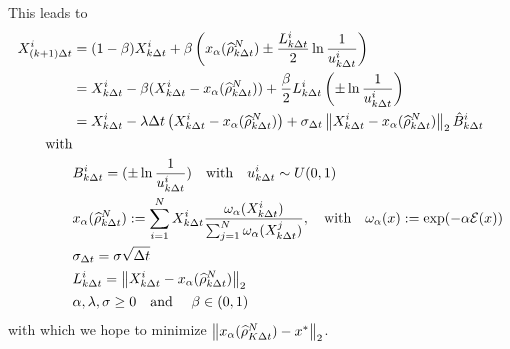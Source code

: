 \documentclass[a4paper, 11pt]{article}
\newcommand{\globmin}{x^*}
\newcommand{\omegaa}[0]{\omega_{\alpha}}
\newcommand{\conspoint}[1]{x_{\alpha}({#1})}
\newcommand{\empmeasure}[1]{\widehat\rho_{#1}^N}
\begin{document}
This leads to
\begin{align}
    X^i_{(k+1)\Delta t} & = (1-\beta) X^i_{k\Delta t} + \beta \left(\conspoint{\empmeasure{k\Delta t}} \pm \frac{L^i_{k\Delta t}}{2} \ln{\frac{1}{u^i_{k\Delta t}}} \right) \nonumber                                                                   \\
                        & = X^i_{k\Delta t} - \beta (X^i_{k\Delta t} - \conspoint{\empmeasure{k\Delta t}}) + \frac{\beta}{2} L^i_{k\Delta t} \left(\pm\ln{\frac{1}{u^i_{k\Delta t}}}\right)  \nonumber                                                  \\
                        & = X^i_{k\Delta t} - {\lambda\Delta t} \left(X^i_{k\Delta t} - \conspoint{\empmeasure{k\Delta t}}\right) + \sigma_{\Delta t} \N{ X_{k\Delta t}^i-\conspoint{\empmeasure{k\Delta t}}}_2 \hat B_{k\Delta t}^i\label{qcbo:update} \\
    \textrm{with}                      \nonumber                                                                                                                                                                                                        \\
                        & B_{k\Delta t}^i = (\pm\ln{\frac{1}{u^i_{k\Delta t}}}) \quad \textrm{with} \quad u^i_{k\Delta t}\sim U(0,1) \label{qcbo:random}                                                                                                \\
                        & \conspoint{\empmeasure{k\Delta t}} := \sum_{i=1}^N X^i_{k\Delta t} \frac{\omegaa(X^i_{k\Delta t})}{\sum_{j=1}^N \omegaa(X^j_{k\Delta t})},\quad \textrm{with}\quad \omegaa(x) := \exp(-\alpha \CE(x)) \label{qcbo:attractor}    \\
                        & \sigma_{\Delta t} = \sigma\sqrt{\Delta t} \label{qcbo:sigma}                                                                                                                                                                  \\
                        & L^i_{k\Delta t} = \N{ X_{k\Delta t}^i-\conspoint{\empmeasure{k\Delta t}}}_2 \label{qcbo:length}                                                                                                                               \\
                        & \alpha, \lambda, \sigma \geq 0     \quad \textrm{and } \quad  \beta \in (0,1)         \nonumber
\end{align}
with which we hope to minimize $\N{\conspoint{\empmeasure{K\Delta t}}-\globmin}_2$.
\end{document}
